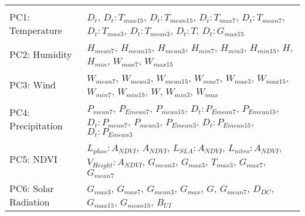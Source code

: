 \begin{table}[!htbp] \centering 
\begin{tabular}{p{18mm}|p{58mm}} 
\hline 
\hline \\ 
PC1: Temperature & $D_{t}$, $D_{t}:T_{max15}$, $D_{t}:T_{mean15}$, $D_{t}:T_{max7}$, $D_{t}:T_{mean7}$, $D_{t}:T_{max3}$, $D_{t}:T_{mean3}$, $D_{t}:T$, $D_{t}:G_{max15}$ \\%
PC2: Humidity & $H_{mean7}$, $H_{mean15}$, $H_{mean3}$, $H_{min7}$, $H_{min3}$, $H_{min15}$, $H$, $H_{min}$, $W_{max7}$, $W_{max15}$ \\%
PC3: Wind & $W_{mean7}$, $W_{mean3}$, $W_{mean15}$, $W_{max7}$, $W_{max3}$, $W_{max15}$, $W_{min7}$, $W_{min15}$, $W$, $W_{min3}$, $W_{max}$ \\ %
PC4: Precipitation & $P_{mean7}$, $P_{Emean7}$, $P_{mean15}$, $D_{t}:P_{Emean7}$, $P_{Emean15}$, $D_{t}:P_{mean7}$, $P_{mean3}$, $P_{Emean3}$, $D_{t}:P_{Emean15}$, $D_{t}:P_{Emean3}$ \\%
PC5: NDVI & $L_{phos}:A_{NDVI}$, $A_{NDVI}$, $L_{SLA}:A_{NDVI}$, $L_{nitro}:A_{NDVI}$, $V_{Height}:A_{NDVI}$, $G_{mean3}$, $G_{max3}$, $T_{max3}$, $G_{max7}$, $G_{mean7}$ \\ %
PC6: Solar Radiation & $G_{max3}$, $G_{max7}$, $G_{mean3}$, $G_{max}$, $G$, $G_{mean7}$, $D_{DC}$, $G_{max15}$, $G_{mean15}$, $B_{UI}$ \\%

\end{tabular}
\end{table}
